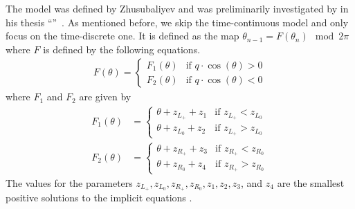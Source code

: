The model was defined by Zhusubaliyev and was preliminarily investigated by  in his thesis ``''~\cite{akyuz2022}.
As mentioned before, we skip the time-continuous model and only focus on the time-discrete one.
It is defined as the map $\theta_{n-1} = F(\theta_n) \mod 2 \pi$ where $F$ is defined by the following equations.
\begin{align}
	F(\theta) = \begin{cases}
		            F_1(\theta) & \text{if } q \cdot \cos(\theta) > 0 \\
		            F_2(\theta) & \text{if } q \cdot \cos(\theta) < 0
	            \end{cases}
\end{align}
where $F_1$ and $F_2$ are given by
\begin{subequations}
	\begin{align}
		F_1(\theta) & = \begin{cases}
			                \theta + z_{L_+} + z_1 & \text{if } z_{L_+} < z_{L_0} \\
			                \theta + z_{L_0} + z_2 & \text{if } z_{L_+} > z_{L_0}
		                \end{cases} \\
		F_2(\theta) & = \begin{cases}
			                \theta + z_{R_+} + z_3 & \text{if } z_{R_+} < z_{R_0} \\
			                \theta + z_{R_0} + z_4 & \text{if } z_{R_+} > z_{R_0}
		                \end{cases}
	\end{align}
\end{subequations}
The values for the parameters $z_{L_+}, z_{L_0}, z_{R_+}, z_{R_0}, z_1, z_2, z_3$, and $z_4$ are the smallest positive solutions to the implicit equations .
